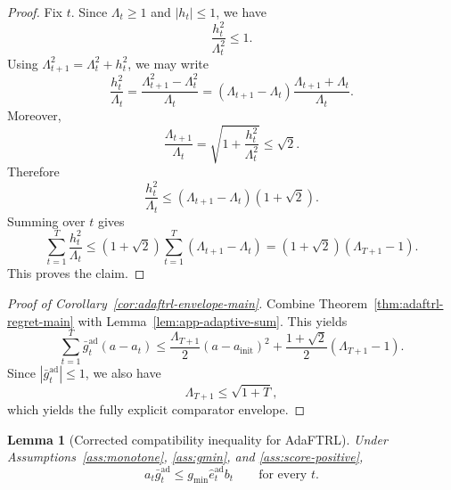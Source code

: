\documentclass[11pt]{article}
\newtheorem{lemma}{Lemma}
\newcommand{\1}{\mathbf{1}}
\begin{document}
\begin{proof}
Fix \(t\). Since \(\Lambda_t\ge 1\) and \(|h_t|\le 1\), we have
\[
\frac{h_t^2}{\Lambda_t^2}\le 1.
\]
Using \(\Lambda_{t+1}^2=\Lambda_t^2+h_t^2\), we may write
\[
\frac{h_t^2}{\Lambda_t}
=
\frac{\Lambda_{t+1}^2-\Lambda_t^2}{\Lambda_t}
=
(\Lambda_{t+1}-\Lambda_t)\frac{\Lambda_{t+1}+\Lambda_t}{\Lambda_t}.
\]
Moreover,
\[
\frac{\Lambda_{t+1}}{\Lambda_t}
=
\sqrt{1+\frac{h_t^2}{\Lambda_t^2}}
\le \sqrt{2}.
\]
Therefore
\[
\frac{h_t^2}{\Lambda_t}
\le
(\Lambda_{t+1}-\Lambda_t)(1+\sqrt{2}).
\]
Summing over \(t\) gives
\[
\sum_{t=1}^T \frac{h_t^2}{\Lambda_t}
\le
(1+\sqrt{2})\sum_{t=1}^T (\Lambda_{t+1}-\Lambda_t)
=
(1+\sqrt{2})(\Lambda_{T+1}-1).
\]
This proves the claim.
\end{proof}

\begin{proof}[Proof of Corollary~\ref{cor:adaftrl-envelope-main}]
Combine Theorem~\ref{thm:adaftrl-regret-main} with Lemma~\ref{lem:app-adaptive-sum}. This yields
\[
\sum_{t=1}^T \bar g_t^{\mathrm{ad}}(a-a_t)
\le
\frac{\Lambda_{T+1}}{2}(a-a_{\mathrm{init}})^2
+
\frac{1+\sqrt{2}}{2}(\Lambda_{T+1}-1).
\]
Since \(|\bar g_t^{\mathrm{ad}}|\le 1\), we also have
\[
\Lambda_{T+1} \le \sqrt{1+T},
\]
which yields the fully explicit comparator envelope.
\end{proof}

\begin{lemma}[Corrected compatibility inequality for AdaFTRL]
\label{lem:compatibility-ad}
Under Assumptions~\ref{ass:monotone}, \ref{ass:gmin}, and \ref{ass:score-positive},
\[
a_t\bar g_t^{\mathrm{ad}}
\le
 g_{\min}\hat e_t^{\mathrm{ad}} b_t
\qquad\text{for every }t.
\]
\end{lemma}
\end{document}
